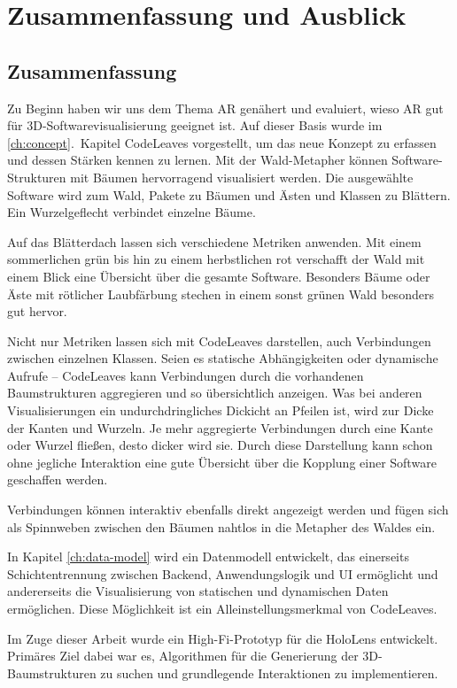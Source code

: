 \chapter{Zusammenfassung und Ausblick}
\label{ch:conclusion}

\section{Zusammenfassung}

Zu Beginn haben wir uns dem Thema AR genähert und evaluiert, wieso AR gut für 3D-Softwarevisualisierung geeignet ist. Auf dieser Basis wurde im \ref{ch:concept}.\ Kapitel CodeLeaves vorgestellt, um das neue Konzept zu erfassen und dessen Stärken kennen zu lernen. Mit der Wald-Metapher können Software-Strukturen mit Bäumen hervorragend visualisiert werden. Die ausgewählte Software wird zum Wald, Pakete zu Bäumen und Ästen und Klassen zu Blättern. Ein Wurzelgeflecht verbindet einzelne Bäume.

Auf das Blätterdach lassen sich verschiedene Metriken anwenden. Mit einem sommerlichen grün bis hin zu einem herbstlichen rot verschafft der Wald mit einem Blick eine Übersicht über die gesamte Software. Besonders Bäume oder Äste mit rötlicher Laubfärbung stechen in einem sonst grünen Wald besonders gut hervor.

Nicht nur Metriken lassen sich mit CodeLeaves darstellen, auch Verbindungen zwischen einzelnen Klassen. Seien es statische Abhängigkeiten oder dynamische Aufrufe -- CodeLeaves kann Verbindungen durch die vorhandenen Baumstrukturen aggregieren und so übersichtlich anzeigen. Was bei anderen Visualisierungen ein undurchdringliches Dickicht an Pfeilen ist, wird zur Dicke der Kanten und Wurzeln. Je mehr aggregierte Verbindungen durch eine Kante oder Wurzel fließen, desto dicker wird sie. Durch diese Darstellung kann schon ohne jegliche Interaktion eine gute Übersicht über die Kopplung einer Software geschaffen werden.

Verbindungen können interaktiv ebenfalls direkt angezeigt werden und fügen sich als Spinnweben zwischen den Bäumen nahtlos in die Metapher des Waldes ein.

In Kapitel \ref{ch:data-model} wird ein Datenmodell entwickelt, das einerseits Schichtentrennung zwischen Backend, Anwendungslogik und UI ermöglicht und andererseits die Visualisierung von statischen und dynamischen Daten ermöglichen. Diese Möglichkeit ist ein Alleinstellungsmerkmal von CodeLeaves.

Im Zuge dieser Arbeit wurde ein High-Fi-Prototyp für die HoloLens entwickelt. Primäres Ziel dabei war es, Algorithmen für die Generierung der 3D-Baumstrukturen zu suchen und grundlegende Interaktionen zu implementieren.

